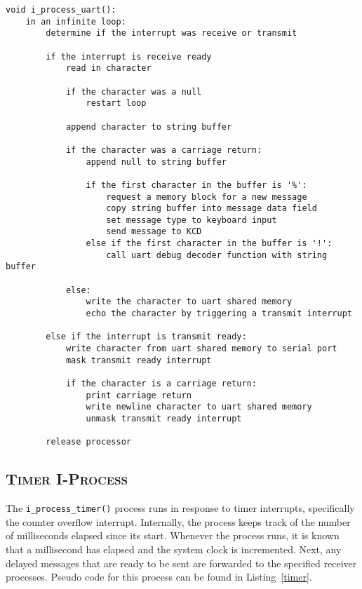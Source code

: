 \documentclass[oneside]{report}
\begin{document}
\begin{lstlisting}
void i_process_uart():
    in an infinite loop:
        determine if the interrupt was receive or transmit

        if the interrupt is receive ready
            read in character

            if the character was a null
                restart loop

            append character to string buffer
            
            if the character was a carriage return:
                append null to string buffer
                
                if the first character in the buffer is '%':
                    request a memory block for a new message
                    copy string buffer into message data field
                    set message type to keyboard input
                    send message to KCD
                else if the first character in the buffer is '!':
                    call uart debug decoder function with string buffer        

            else:
                write the character to uart shared memory
                echo the character by triggering a transmit interrupt

        else if the interrupt is transmit ready:
            write character from uart shared memory to serial port
            mask transmit ready interrupt
            
            if the character is a carriage return:
                print carriage return
                write newline character to uart shared memory
                unmask transmit ready interrupt
            
        release processor
\end{lstlisting}

\subsection{\textsc{Timer I-Process}}

The \texttt{i\_process\_timer()} process runs in response to timer
interrupts, specifically the counter overflow interrupt. Internally,
the process keeps track of the number of milliseconds elapsed since
its start. Whenever the process runs, it is known that a millisecond
has elapsed and the system clock is incremented. Next, any delayed
messages that are ready to be sent are forwarded to the specified
receiver processes. Pseudo code for this process can be found in
Listing~\ref{timer}.
\end{document}
